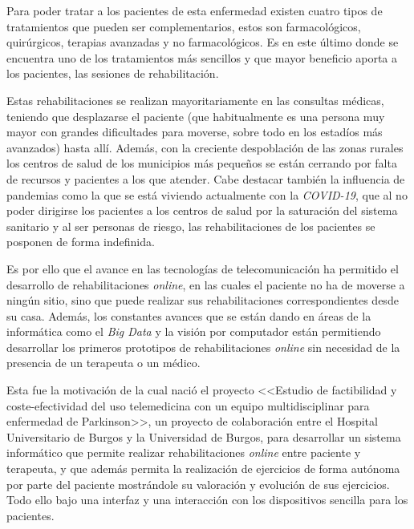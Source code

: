 Para poder tratar a los pacientes de esta enfermedad existen cuatro tipos de tratamientos que pueden ser complementarios, estos son farmacológicos, quirúrgicos, terapias avanzadas y no farmacológicos. Es en este último donde se encuentra uno de los tratamientos más sencillos y que mayor beneficio aporta a los pacientes, las sesiones de rehabilitación.

Estas rehabilitaciones se realizan mayoritariamente en las consultas médicas, teniendo que desplazarse el paciente (que habitualmente es una persona muy mayor con grandes dificultades para moverse, sobre todo en los estadíos más avanzados) hasta allí. Además, con la creciente despoblación de las zonas rurales los centros de salud de los municipios más pequeños se están cerrando por falta de recursos y pacientes a los que atender. Cabe destacar también la influencia de pandemias como la que se está viviendo actualmente con la \textit{COVID-19}, que al no poder dirigirse los pacientes a los centros de salud por la saturación del sistema sanitario y al ser personas de riesgo, las rehabilitaciones de los pacientes se posponen de forma indefinida.

Es por ello que el avance en las tecnologías de telecomunicación ha permitido el desarrollo de rehabilitaciones \textit{online}, en las cuales el paciente no ha de moverse a ningún sitio, sino que puede realizar sus rehabilitaciones correspondientes desde su casa. Además, los constantes avances que se están dando en áreas de la informática como el \textit{Big Data} y la visión por computador están permitiendo desarrollar los primeros prototipos de rehabilitaciones \textit{online} sin necesidad de la presencia de un terapeuta o un médico.

Esta fue la motivación de la cual nació el proyecto <<Estudio de factibilidad y coste-efectividad del uso telemedicina con un equipo multidisciplinar para enfermedad de Parkinson>>, un proyecto de colaboración entre el Hospital Universitario de Burgos y la Universidad de Burgos, para desarrollar un sistema informático que permite realizar rehabilitaciones \textit{online} entre paciente y terapeuta, y que además permita la realización de ejercicios de forma autónoma por parte del paciente mostrándole su valoración y evolución de sus ejercicios. Todo ello bajo una interfaz y una interacción con los dispositivos sencilla para los pacientes.

